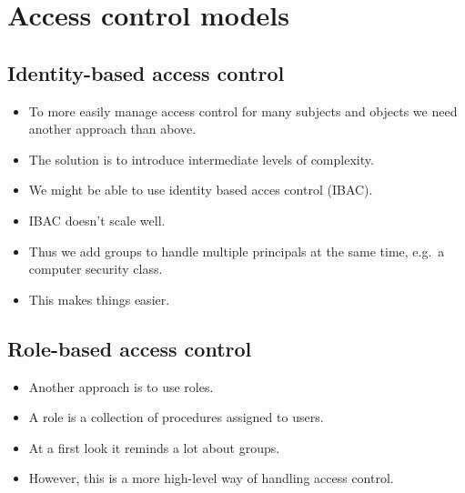 \section{Access control models}

\subsection{Identity-based access control}

\begin{frame}
  \begin{itemize}
    \item To more easily manage access control for many subjects and objects we 
      need another approach than above.

    \item The solution is to introduce intermediate levels of complexity.

  \end{itemize}
\end{frame}

\begin{frame}
  \begin{itemize}
    \item We might be able to use identity based acces control (IBAC).
    \item IBAC doesn't scale well.

    \item Thus we add groups to handle multiple principals at the same time, 
      e.g.\ a computer security class.

    \item This makes things easier.

  \end{itemize}
\end{frame}

\subsection{Role-based access control}

\begin{frame}
  \begin{itemize}
    \item Another approach is to use roles.

    \item A role is a collection of procedures assigned to users.

    \item At a first look it reminds a lot about groups.

    \item However, this is a more high-level way of handling access control.

  \end{itemize}
\end{frame}

